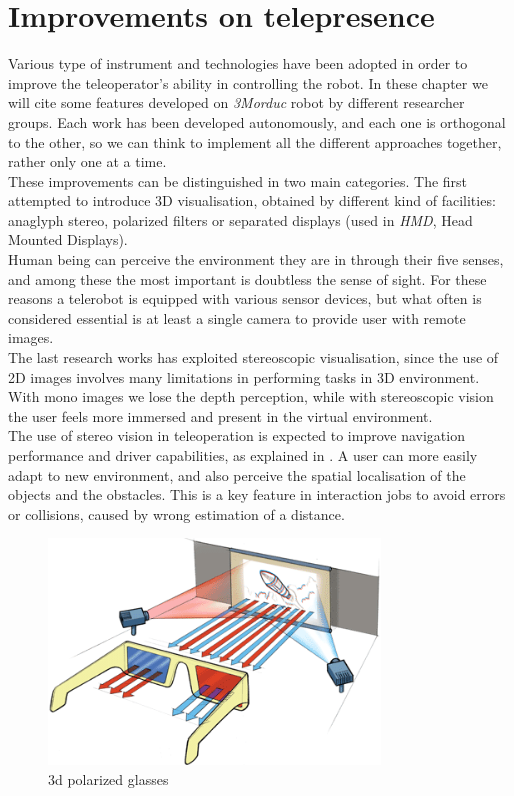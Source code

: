 \section{Improvements on telepresence}
\label{intro:improvements_telepresence}

Various type of instrument and technologies have been adopted in order
to improve the teleoperator's ability in controlling the robot. In
these chapter we will cite some features developed on \textit{3Morduc}
robot by different researcher groups. Each work has been developed
autonomously, and each one is orthogonal to the other, so we can think
to implement all the different approaches together, rather only one
at a time.
\\
These improvements can be distinguished in two main categories. The
first attempted to introduce 3D visualisation, obtained by different
kind of facilities: anaglyph stereo, polarized filters or separated
displays (used in \textit{HMD}, Head Mounted Displays).
\\
Human being can perceive the environment they are in through their
five senses, and among these the most important is doubtless the sense
of sight.
For these reasons a telerobot is equipped with various sensor devices,
but what often is considered essential is at least a single camera to
provide user with remote images.
\\
The last research works has exploited stereoscopic visualisation, since
the use of 2D images involves many limitations in performing tasks
in 3D environment. With mono images we lose the depth perception,
while with stereoscopic vision the user feels more immersed and
present in the virtual environment.
\\
The use of stereo vision in teleoperation is expected
to improve navigation performance and driver capabilities, as explained in
\cite{morduc:neri}. A user can more easily adapt to new environment, and
also perceive the spatial localisation of the objects and the obstacles.
This is a key feature in interaction jobs to avoid errors or collisions,
caused by wrong estimation of a distance.

\begin{figure} [!h]
  \begin{center}
    \includegraphics[width=250pt]{img/3d-glasses.png}
    \caption{3d polarized glasses}
    \label{fig:3d-glasses}
  \end{center}
\end{figure}

